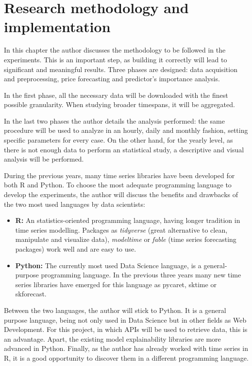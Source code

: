 \chapter{Research methodology and implementation}
\label{ch:methodology}
In this chapter the author discusses the methodology to be followed in the experiments. This is an important step, as building it correctly will lead to significant and meaningful results.
Three phases are designed: data acquisition and preprocessing, price forecasting and predictor's importance analysis.

In the first phase, all the necessary data will be downloaded with the finest possible granularity.
When studying broader timespans, it will be aggregated.

In the last two phases the author details the analysis performed: the same procedure will be used to analyze in an hourly, daily and monthly fashion, setting specific parameters for every case.
On the other hand, for the yearly level, as there is not enough data to perform an statistical study, a descriptive and visual analysis will be performed.

During the previous years, many time series libraries have been developed for both R and Python. To choose the most adequate programming language to develop the experiments, the author will discuss the benefits and drawbacks of the two most used languages by data scientists:
\begin{itemize}
    \item \textbf{R:} An statistics-oriented programming language, having longer tradition in time series modelling. Packages as \textit{tidyverse} (great alternative to clean, manipulate and visualize data), \textit{modeltime} or \textit{fable} (time series forecasting packages) work well and are easy to use.
    \item \textbf{Python:} The currently most used Data Science language, is a general-purpose programming language. In the previous three years many new time series libraries have emerged for this language as pycaret, sktime or skforecast.
\end{itemize}

Between the two languages, the author will stick to Python. It is a general purpose language, being not only used in Data Science but in other fields as Web Development. For this project, in which APIs will be used to retrieve data, this is an advantage. Apart, the existing model explainability libraries are more advanced in Python. Finally, as the author has already worked with time series in R, it is a good opportunity to discover them in a different programming language.

